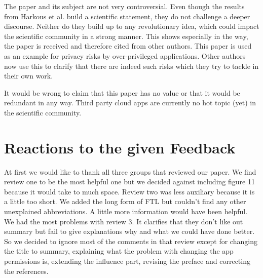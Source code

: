 \documentclass[11pt,twocolumn,a4paper,DIV=calc]{scrartcl}
\begin{document}
The paper and its subject are not very controversial. Even though the results from Harkous et al. build a scientific statement, they do not challenge a deeper discourse. Neither do they build up to any revolutionary idea, which could impact the scientific community in a strong manner. This shows especially in the way, the paper is received and therefore cited from other authors. This paper is used as an example for privacy risks by over-privileged applications.
Other authors now use this to clarify that there are indeed such risks which they try to tackle in their own work.

It would be wrong to claim that this paper has no value or that it would be redundant in any way. Third party cloud apps are currently no hot topic (yet) in the scientific community.
\section{Reactions to the given Feedback} 
At first we would like to thank all three groups that reviewed our paper. We find review one to be the most helpful one but we decided against including figure 11 because it would take to much space. Review two was less auxiliary because it is a little too short. We added the long form of FTL but couldn't find any other unexplained abbreviations. A little more information would have been helpful. We had the most problems with review 3. It clarifies that they don't like out summary but fail to give explanations why and what we could have done better. So we decided to ignore most of the comments in that review except for changing the title to summary, explaining what the problem with changing the app permissions is, extending the influence part, revising the preface and correcting the references. 
\end{document}
